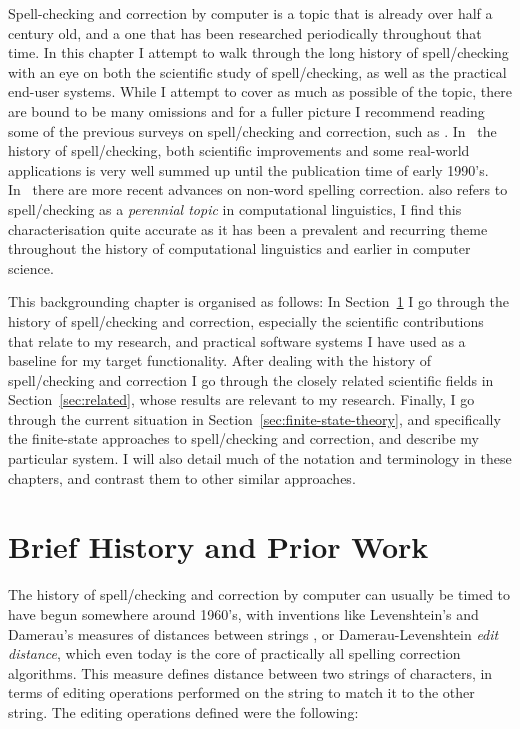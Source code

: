 \documentclass[officiallayout]{unihelcompling}
\begin{document}
Spell-checking and correction by computer is a topic that is already over half
a century old, and a one that has been researched periodically throughout that
time.  In this chapter I attempt to walk through the long history of
spell\-/checking with an eye on both the scientific study of spell\-/checking,
as well as the practical end-user systems. While I attempt to cover as
much as possible of the topic, there are bound to be many omissions and for
a fuller picture I recommend reading some of the previous surveys on
spell\-/checking and correction, such as
\citet{kukich1992spelling,mitton2009ordering}.  In~\citet{kukich1992spelling}
the history of spell\-/checking, both scientific improvements and some
real-world applications is very well summed up until the publication time of
early 1990's.  In~\citet{mitton2009ordering} there are more recent advances on
non-word spelling correction.  \citet{kukich1992spelling} also refers to
spell\-/checking as a \emph{perennial topic} in computational linguistics, I
find this characterisation quite accurate as it has been a prevalent and
recurring theme throughout the history of computational linguistics and earlier
in computer science.


This backgrounding chapter is organised as follows: In
Section~\ref{sec:history} I go through the history of spell\-/checking and
correction, especially the scientific contributions that relate to my research,
and practical software systems I have used as a baseline for my target
functionality.  After dealing with the history of spell\-/checking and
correction I go through the closely related scientific fields in
Section~\ref{sec:related}, whose results are relevant to my research. Finally,
I go through the current situation in Section~\ref{sec:finite-state-theory},
and specifically the finite-state approaches to spell\-/checking and
correction, and describe my particular system. I will also detail much of the
notation and terminology in these chapters, and contrast them to other similar
approaches.

\section{Brief History and Prior Work}
\label{sec:history}

The history of spell\-/checking and correction by computer can usually be timed
to have begun somewhere around 1960's, with inventions like Levenshtein's and
Damerau's measures of distances between strings
\citep{levenshtein1966binary,damerau1964technique}, or Damerau-Levenshtein
\emph{edit distance}, which even today is the core of practically all spelling
correction algorithms. This measure defines distance between two strings of
characters, in terms of editing operations performed on the string to match it
to the other string. The editing operations defined were the following:
\end{document}
